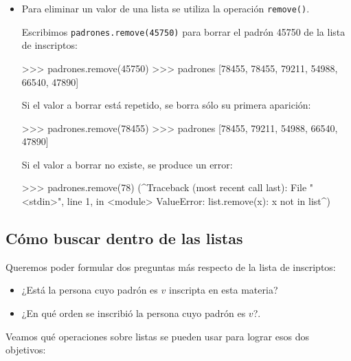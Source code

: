 \begin{itemize}
\item Para eliminar un valor de una lista se utiliza la operación
\lstinline+remove()+.

Escribimos \lstinline+padrones.remove(45750)+ para borrar el padrón 45750 de la
lista de inscriptos:

\begin{codigo-python-sn}
>>> padrones.remove(45750)
>>> padrones
[78455, 78455, 79211, 54988, 66540, 47890]
\end{codigo-python-sn}

Si el valor a borrar está repetido, se borra sólo su primera aparición:

\begin{codigo-python-sn}
>>> padrones.remove(78455)
>>> padrones
[78455, 79211, 54988, 66540, 47890]
\end{codigo-python-sn}

\begin{atencion}
Si el valor a borrar no existe, se produce un error:

\begin{codigo-python-sn}
>>> padrones.remove(78)
(^Traceback (most recent call last):
  File "<stdin>", line 1, in <module>
ValueError: list.remove(x): x not in list^)
\end{codigo-python-sn}
\end{atencion}
\end{itemize}

\subsection{Cómo buscar dentro de las listas}

Queremos poder formular dos preguntas más respecto de la lista de
inscriptos:

\begin{itemize}
\item ¿Está la persona cuyo padrón es $v$ inscripta en esta materia?

\item ¿En qué orden se inscribió la persona cuyo padrón es $v$?.
\end{itemize}

Veamos qué operaciones sobre listas se pueden usar para lograr esos dos
objetivos:

